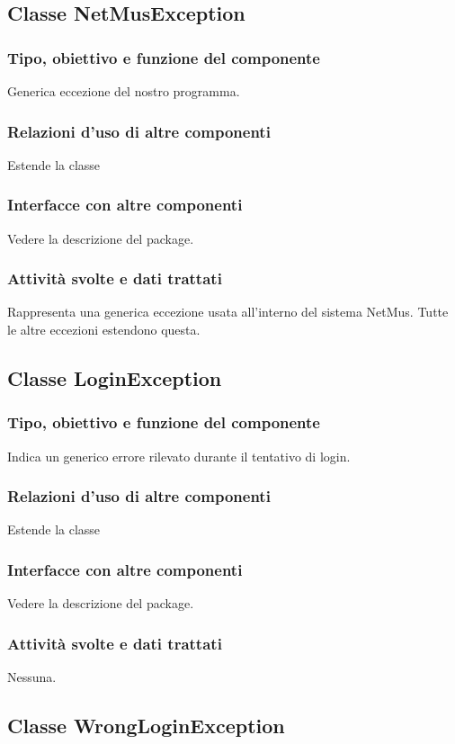 \subsection{Classe NetMusException}
\subsubsection*{Tipo, obiettivo e funzione del componente}
Generica eccezione del nostro programma.
\subsubsection*{Relazioni d'uso di altre componenti}
Estende la classe 
\subsubsection*{Interfacce con altre componenti}
Vedere la descrizione del package.
\subsubsection*{Attivit\`a svolte e dati trattati}
Rappresenta una generica eccezione usata all'interno del sistema NetMus.
Tutte le altre eccezioni estendono questa.

\subsection{Classe LoginException}
\subsubsection*{Tipo, obiettivo e funzione del componente}
Indica un generico errore rilevato durante il tentativo di login.
\subsubsection*{Relazioni d'uso di altre componenti}
Estende la classe 
\subsubsection*{Interfacce con altre componenti}
Vedere la descrizione del package.
\subsubsection*{Attivit\`a svolte e dati trattati}
Nessuna.

\subsection{Classe WrongLoginException}
